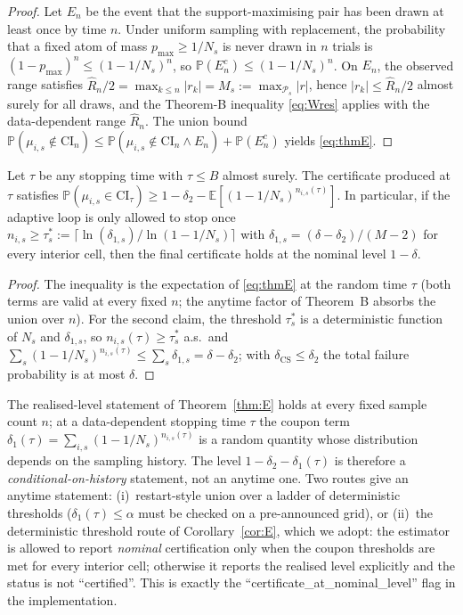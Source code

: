 \documentclass[11pt,twocolumn]{article}
\newcommand{\E}{\mathbb{E}}
\newcommand{\P}{\mathbb{P}}
\begin{document}
\begin{proof}
Let $E_n$ be the event that the support-maximising pair has been drawn at
least once by time $n$.  Under uniform sampling with replacement, the
probability that a fixed atom of mass $p_{\max}\ge1/N_s$ is never drawn in
$n$ trials is $(1-p_{\max})^n\le(1-1/N_s)^n$, so
$\P(E_n^c)\le(1-1/N_s)^n$.  On $E_n$, the observed range satisfies
$\hat R_n/2=\max_{k\le n}|r_k|=M_s:=\max_{\mathcal{P}_s}|r|$, hence
$|r_k|\le\hat R_n/2$ almost surely for all draws, and the Theorem-B
inequality \eqref{eq:Wres} applies with the data-dependent range
$\hat R_n$.  The union bound
$\P(\mu_{i,s}\notin\mathrm{CI}_n)\le
\P(\mu_{i,s}\notin\mathrm{CI}_n\wedge E_n)+\P(E_n^c)$ yields
\eqref{eq:thmE}.
\end{proof}

\begin{corollary}
\label{cor:E}
Let $\tau$ be any stopping time with $\tau\le B$ almost surely.  The
certificate produced at $\tau$ satisfies
$\P(\mu_{i,s}\in\mathrm{CI}_\tau)\ge
1-\delta_2-\E[(1-1/N_s)^{n_{i,s}(\tau)}]$.  In particular, if the adaptive
loop is only allowed to stop once
$n_{i,s}\ge\tau_s^*:=\big\lceil
\ln(\delta_{1,s})/\ln(1-1/N_s)\big\rceil$ with
$\delta_{1,s}=(\delta-\delta_2)/(M-2)$ for every interior cell, then the
final certificate holds at the nominal level $1-\delta$.
\end{corollary}

\begin{proof}
The inequality is the expectation of \eqref{eq:thmE} at the random time
$\tau$ (both terms are valid at every fixed $n$; the anytime factor of
Theorem~B absorbs the union over $n$).  For the second claim, the threshold
$\tau_s^*$ is a deterministic function of $N_s$ and $\delta_{1,s}$, so
$n_{i,s}(\tau)\ge\tau_s^*$ a.s.\ and
$\sum_s (1-1/N_s)^{n_{i,s}(\tau)}\le
\sum_s \delta_{1,s}=\delta-\delta_2$; with
$\delta_{\mathrm{CS}}\le\delta_2$ the total failure probability is at most
$\delta$.
\end{proof}

\begin{remark}
\label{rem:stopping}
The realised-level statement of Theorem~\ref{thm:E} holds at every fixed
sample count $n$; at a data-dependent stopping time $\tau$ the coupon term
$\delta_1(\tau)=\sum_{i,s}(1-1/N_s)^{n_{i,s}(\tau)}$ is a random quantity
whose distribution depends on the sampling history.  The level
$1-\delta_2-\delta_1(\tau)$ is therefore a \emph{conditional-on-history}
statement, not an anytime one.  Two routes give an anytime statement:
(i)~restart-style union over a ladder of deterministic thresholds
($\delta_1(\tau)\le\alpha$ must be checked on a pre-announced grid), or
(ii)~the deterministic threshold route of
Corollary~\ref{cor:E}, which we adopt: the estimator is allowed to report
\emph{nominal} certification only when the coupon thresholds are met for
every interior cell; otherwise it reports the realised level explicitly and
the status is not ``certified''.  This is exactly the
``certificate\_at\_nominal\_level'' flag in the implementation.
\end{remark}
\end{document}
